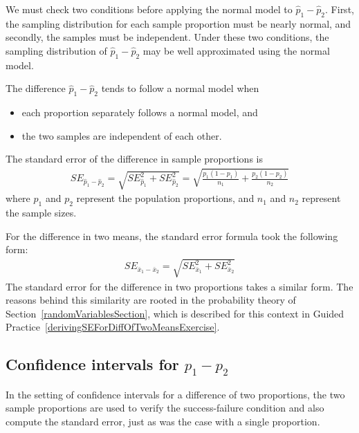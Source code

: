 We must check two conditions before applying the normal model to $\hat{p}_1 - \hat{p}_2$. First, the sampling distribution for each sample proportion must be nearly normal, and secondly, the samples must be independent. Under these two conditions, the sampling distribution of $\hat{p}_1 - \hat{p}_2$ may be well approximated using the normal model.

\begin{termBox}{
The difference $\hat{p}_1 - \hat{p}_2$ tends to follow a normal model when
\begin{itemize}
\setlength{\itemsep}{0mm}
\item each proportion separately follows a normal model, and
\item the two samples are independent of each other.
\end{itemize}
The standard error of the difference in sample proportions is
\begin{eqnarray}
SE_{\hat{p}_1 - \hat{p}_2}
	= \sqrt{SE_{\hat{p}_1}^2 + SE_{\hat{p}_2}^2}
	= \sqrt{\frac{p_1(1-p_1)}{n_1} + \frac{p_2(1-p_2)}{n_2}}
\label{seForDiffOfProp}
\end{eqnarray}
where $p_1$ and $p_2$ represent the population proportions, and $n_1$ and $n_2$ represent the sample sizes.}
\end{termBox}

For the difference in two means, the standard error formula took the following form:
\begin{eqnarray*}
SE_{\bar{x}_{1} - \bar{x}_{2}} = \sqrt{SE_{\bar{x}_1}^2 + SE_{\bar{x}_2}^2}
\end{eqnarray*}
The standard error for the difference in two proportions takes a similar form. The reasons behind this similarity are rooted in the probability theory of Section~\ref{randomVariablesSection}, which is described for this context in Guided Practice~\vref{derivingSEForDiffOfTwoMeansExercise}.


\subsection{Confidence intervals for $p_1 -p_2$}

In the setting of confidence intervals for a difference of two proportions, the two sample proportions are used to verify the success-failure condition and also compute the standard error, just as was the case with a single proportion.

